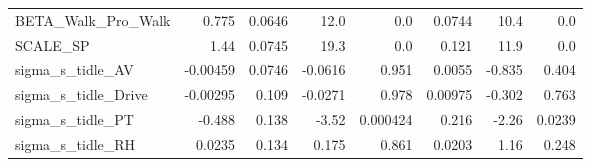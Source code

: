 \begin{tabular}{lrrrrrrr}
BETA\_Walk\_Pro\_Walk           &    0.775 &   0.0646 &    12.0 &      0.0 &        0.0744 &         10.4 &           0.0 \\
SCALE\_SP                     &     1.44 &   0.0745 &    19.3 &      0.0 &         0.121 &         11.9 &           0.0 \\
sigma\_s\_tidle\_AV             & -0.00459 &   0.0746 & -0.0616 &    0.951 &        0.0055 &       -0.835 &         0.404 \\
sigma\_s\_tidle\_Drive          & -0.00295 &    0.109 & -0.0271 &    0.978 &       0.00975 &       -0.302 &         0.763 \\
sigma\_s\_tidle\_PT             &   -0.488 &    0.138 &   -3.52 & 0.000424 &         0.216 &        -2.26 &        0.0239 \\
sigma\_s\_tidle\_RH             &   0.0235 &    0.134 &   0.175 &    0.861 &        0.0203 &         1.16 &         0.248 \\
\bottomrule
\end{tabular}

